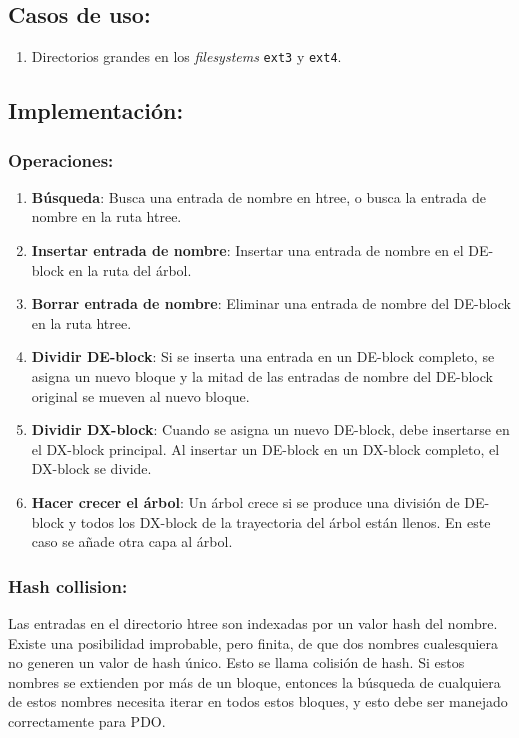 \documentclass[]{article}
\begin{document}
	\subsection{Casos de uso:}
		\begin{enumerate}
			\item Directorios grandes en los \textit{filesystems} \texttt{ext3} y \texttt{ext4}.
		\end{enumerate}
	\subsection{Implementación:}
	\subsubsection{Operaciones:}
		\begin{enumerate}
			\item \textbf{Búsqueda}: Busca una entrada de nombre en htree, o busca la entrada de nombre en la ruta htree.
			
			\item \textbf{Insertar entrada de nombre}: Insertar una entrada de nombre en el DE-block en la ruta del árbol.
			
			\item \textbf{Borrar entrada de nombre}: Eliminar una entrada de nombre del DE-block en la ruta htree.
			
			\item \textbf{Dividir DE-block}: Si se inserta una entrada en un DE-block completo, se asigna un nuevo bloque y la mitad de las entradas de nombre del DE-block original se mueven al nuevo bloque.
			
			\item \textbf{Dividir DX-block}: Cuando se asigna un nuevo DE-block, debe insertarse en el DX-block principal. Al insertar un DE-block en un DX-block completo, el DX-block se divide.
		
			\item \textbf{Hacer crecer el árbol}: Un árbol crece si se produce una división de DE-block y todos los DX-block de la trayectoria del árbol están llenos. En este caso se añade otra capa al árbol.
		\end{enumerate}
	\subsubsection{Hash collision:}
		\par Las entradas en el directorio htree son indexadas por un valor hash del nombre. Existe una posibilidad improbable, pero finita, de que dos nombres cualesquiera no generen un valor de hash único. Esto se llama colisión de hash. Si estos nombres se extienden por más de un bloque, entonces la búsqueda de cualquiera de estos nombres necesita iterar en todos estos bloques, y esto debe ser manejado correctamente para PDO.
\end{document}
